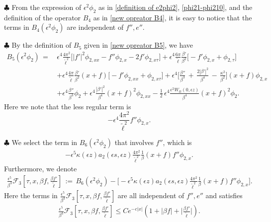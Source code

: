 \documentclass[10pt, reqno]{amsart}
\numberwithin{equation}{section}
\theoremstyle{definition}
\begin{document}
{{\smallskip\noindent $\clubsuit$
From the expression of $\epsilon^2\phi_2$ as in \eqref{definition of e2phi2}, \eqref{phi21-phi210}, and the definition of the operator $B_4$ as in \eqref{new opreator B4}, it is easy to notice that the terms in $B_4(\epsilon^2\phi_2)$ are independent of $f'', e''$.


\smallskip\noindent $\clubsuit$
By the definition of $B_5$ given in \eqref{new opreator B5}, we have
\begin{align} \label{decomposition of B5(phi2)}
B_5 (\epsilon^2{\phi_2})
\,=\,&\epsilon^4\frac{4\pi^2}{{\tilde\ell}^2}\Big[|f'|^2 \phi_{2, xx} -f''\phi_{2, x} -2f' \phi_{2, x\tau}\Big]
+
\epsilon^4\frac{6\pi}{{\tilde\ell}}\frac{\beta'} {\beta^2}\Big[- f' \phi_{2, x} +\phi_{2, \tau}\Big]
\nonumber\\[2mm]
&
+ \epsilon^4 \frac{4\pi}{{\tilde\ell}} \frac{\beta'}{\beta^2} (x+f)\big[- f' \phi_{2, xx} +\phi_{2, x\tau}\big]
+
\epsilon^4\Big[
\frac{\beta''}{\beta^3}\,+\,\frac{2|\beta'|^2}{\beta^4} \,-\,\frac{\kappa^2}{\beta^2} \Big] (x+f) \phi_{2, x}
\nonumber\\[2mm]
&+\epsilon^4\frac{\beta''}{\beta^3}\phi_2
+ \epsilon^4 \frac{|\beta'|^2}{\beta^4}(x+f)^2 \phi_{2, xx}
-\frac{1}{2}\, \epsilon^4\frac{\epsilon^2W_{tt}(0, \epsilon z)}{\beta^4} (x+f)^2 \phi_2.
\end{align}
Here we note that the less regular term is $$-\epsilon^4\frac{4\pi^2}{{\tilde\ell}^2} f''\phi_{2, x}. $$

\smallskip\noindent $\clubsuit$
We select the term in $B_6 (\epsilon^2{\phi_2})$ that involves $f''$, which is
\begin{align*}
-\epsilon^5 \kappa(\epsilon z) a_2(\epsilon s, \epsilon z) \frac{ 4\pi^2} {{\tilde\ell}^2}\frac{1}{\beta} (x+f)f'' \phi_{2, x}.
\end{align*}
Furthermore, we denote
\begin{align} \label{decomposition of B6phi2}
\frac{\epsilon^5}{\beta^3} \mathcal F_3\left[\tau, x, \beta f, \frac{\beta f'}{\tilde\ell}\right] \,:=\, B_6(\epsilon^2\phi_2) -\Bigg[-\epsilon^5 \kappa(\epsilon z) a_2(\epsilon s, \epsilon z) \frac{ 4\pi^2} {{\tilde\ell}^2}\frac{1}{\beta} (x+f)f'' \phi_{2, x}\Bigg].
\end{align}
Here the terms in $\frac{\epsilon^5}{\beta^3} \mathcal F_3\left[\tau, x, \beta f, \frac{\beta f'}{\tilde\ell}\right]$ are all independent of $f'', e''$ and satisfies
\begin{align} \label{estimate of mathcal F3-x}
\frac{\epsilon^5}{\beta^3} \mathcal F_3\left[\tau, x, \beta f, \frac{\beta f'}{\tilde\ell}\right] \le C e^{-c|x|} \left(1+ |\beta f| + \Big|\frac{\beta f'}{\tilde\ell}\Big| \right).
\end{align}





}}
\end{document}
